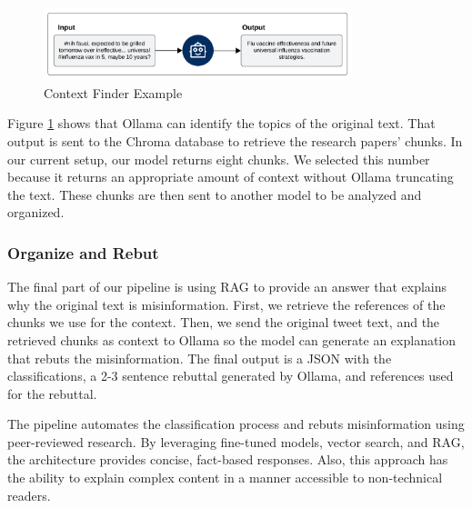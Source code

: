 \begin{figure}[H]
	\begin{center}
		\includegraphics[width=0.8\textwidth]{figures/Context_finder_process.png}
	\end{center}
	\caption{Context Finder Example} 
	\label{fig:cfe}
\end{figure}

\indent Figure \ref{fig:cfe} shows that Ollama can identify the topics of the original text. That output is sent to the Chroma database to retrieve the research papers' chunks. In our current setup, our model returns eight chunks. We selected
this number because it returns an appropriate amount of context without Ollama truncating the text. These chunks are then sent to another model to be analyzed and organized.

\subsubsection{Organize and Rebut}
The final part of our pipeline is using RAG to provide an answer that explains why the original text is misinformation. First, we retrieve the references of the chunks we use for the context. Then, we send the original tweet text, and the retrieved chunks  as context to Ollama so the model can generate an explanation that rebuts the misinformation. The final output is a JSON with the classifications, a 2-3 sentence rebuttal generated by Ollama, and references used for the rebuttal.

The pipeline automates the classification process and rebuts misinformation using peer-reviewed research. By leveraging fine-tuned models, vector search, and RAG, the architecture provides concise, fact-based responses. Also, this
approach has the ability to explain complex content in a manner accessible to non-technical readers. 


